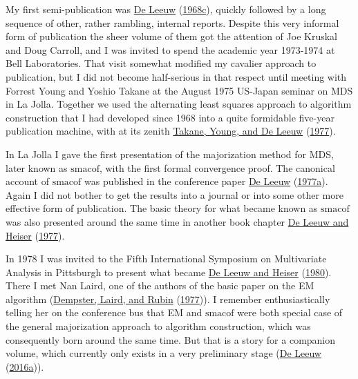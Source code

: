 \documentclass[
  12pt,
]{book}
\theoremstyle{definition}
\theoremstyle{definition}
\theoremstyle{definition}
\theoremstyle{definition}
\theoremstyle{remark}
\begin{document}
My first semi-publication was \protect\hyperlink{ref-deleeuw_R_68g}{De Leeuw} (\protect\hyperlink{ref-deleeuw_R_68g}{1968c}), quickly followed by a long
sequence of other, rather rambling, internal reports. Despite this very
informal form of publication the sheer volume of them got the attention
of Joe Kruskal and Doug Carroll, and I was invited to spend the academic
year 1973-1974 at Bell Laboratories. That visit somewhat modified my
cavalier approach to publication, but I did not become half-serious in
that respect until meeting with Forrest Young and Yoshio Takane at the
August 1975 US-Japan seminar on MDS in La Jolla. Together we used the
alternating least squares approach to algorithm construction that I had
developed since 1968 into a quite formidable five-year publication
machine, with at its zenith \protect\hyperlink{ref-takane_young_deleeuw_A_77}{Takane, Young, and De Leeuw} (\protect\hyperlink{ref-takane_young_deleeuw_A_77}{1977}).

In La Jolla I gave the first presentation of the majorization method for
MDS, later known as \(\textrm{smacof}\), with the first formal convergence proof. The
canonical account of \(\textrm{smacof}\) was published in the conference paper \protect\hyperlink{ref-deleeuw_C_77}{De Leeuw} (\protect\hyperlink{ref-deleeuw_C_77}{1977a}). Again I did not bother to get the results into a journal or into some other
more effective form of publication. The basic theory for what became known as
\(\textrm{smacof}\) was also presented around the same time in another book chapter
\protect\hyperlink{ref-deleeuw_heiser_C_77}{De Leeuw and Heiser} (\protect\hyperlink{ref-deleeuw_heiser_C_77}{1977}).

In 1978 I was invited to the Fifth International Symposium on
Multivariate Analysis in Pittsburgh to present what became
\protect\hyperlink{ref-deleeuw_heiser_C_80}{De Leeuw and Heiser} (\protect\hyperlink{ref-deleeuw_heiser_C_80}{1980}). There I met Nan Laird, one of the authors of the
basic paper on the EM algorithm (\protect\hyperlink{ref-dempster_laird_rubin_77}{Dempster, Laird, and Rubin} (\protect\hyperlink{ref-dempster_laird_rubin_77}{1977})). I remember
enthusiastically telling her on the conference bus that EM and \(\textrm{smacof}\)
were both special case of the general majorization approach to algorithm
construction, which was consequently born around the same time. But that
is a story for a companion volume, which currently only exists in a very
preliminary stage (\protect\hyperlink{ref-deleeuw_B_16b}{De Leeuw} (\protect\hyperlink{ref-deleeuw_B_16b}{2016a})).
\end{document}

